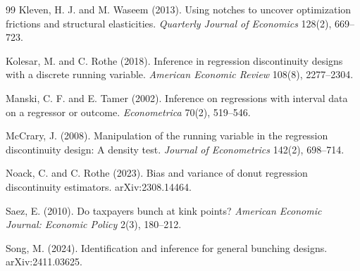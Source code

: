 \documentclass[11pt]{article}
\theoremstyle{definition}
\theoremstyle{plain}
\theoremstyle{remark}
\begin{document}
\begin{thebibliography}{99}
Kleven, H. J. and M. Waseem (2013).
Using notches to uncover optimization frictions and structural elasticities.
\emph{Quarterly Journal of Economics} 128(2), 669--723.

Kolesar, M. and C. Rothe (2018).
Inference in regression discontinuity designs with a discrete running variable.
\emph{American Economic Review} 108(8), 2277--2304.

Manski, C. F. and E. Tamer (2002).
Inference on regressions with interval data on a regressor or outcome.
\emph{Econometrica} 70(2), 519--546.

McCrary, J. (2008).
Manipulation of the running variable in the regression discontinuity design: A density test.
\emph{Journal of Econometrics} 142(2), 698--714.

Noack, C. and C. Rothe (2023).
Bias and variance of donut regression discontinuity estimators.
arXiv:2308.14464.

Saez, E. (2010).
Do taxpayers bunch at kink points?
\emph{American Economic Journal: Economic Policy} 2(3), 180--212.

Song, M. (2024).
Identification and inference for general bunching designs.
arXiv:2411.03625.
\end{thebibliography}
\end{document}
